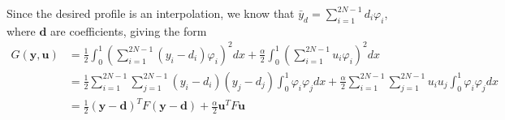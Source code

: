 Since the desired profile is an interpolation, we know that $\bar{y}_d = \sum_{i=1}^{2N-1}d_i\varphi_i$, where $\mathbf{d}$ are coefficients, giving the form
\begin{align*}
    G(\mathbf{y, u}) &= \frac{1}{2}\int_0^1\left( \sum_{i=1}^{2N-1}\left( y_i -d_i\right) \varphi_i \right)^2dx + \frac{\alpha}{2}\int_0^1\left(\sum_{i=1}^{2N-1} u_i \varphi_i  \right)^2dx \\    
    &=\frac{1}{2} \sum_{i=1}^{2N-1}\sum_{j=1}^{2N-1}\left( y_i -d_i\right)\left( y_j -d_j\right) \int_0^1  \varphi_i \varphi_j dx + \frac{\alpha}{2}\sum_{i=1}^{2N-1}\sum_{j=1}^{2N-1} u_i u_j\int_0^1
     \varphi_i \varphi_j dx    \\
     &= \frac{1}{2} \left( \mathbf{y} - \mathbf{d} \right)^T F \left( \mathbf{y} - \mathbf{d} \right) + \frac{\alpha}{2}\mathbf{u}^T F \mathbf{u} 
\end{align*}

